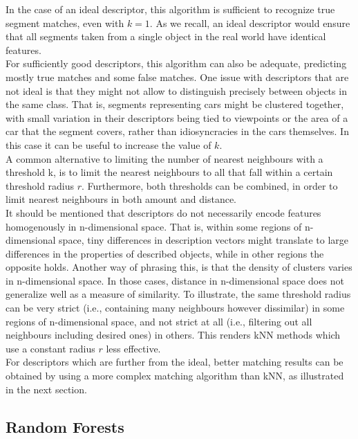 In the case of an ideal descriptor, this algorithm is sufficient to recognize true segment matches, even with $k = 1$. As we recall, an ideal descriptor would ensure that all segments taken from a single object in the real world have identical features.\\ 

For sufficiently good descriptors, this algorithm can also be adequate, predicting mostly true matches and some false matches. One issue with descriptors that are not ideal is that they might not allow to distinguish precisely between objects in the same class.  
That is, segments representing cars might be clustered together, with small variation in their descriptors being tied to viewpoints or the area of a car that the segment covers, rather than idiosyncracies in the cars themselves. In this case it can be useful to increase the value of $k$.\\

A common alternative to limiting the number of nearest neighbours with a threshold k, is to limit the nearest neighbours to all that fall within a certain threshold radius $r$. Furthermore, both thresholds can be combined, in order to limit nearest neighbours in both amount and distance.\\

It should be mentioned that descriptors do not necessarily encode features homogenously in n-dimensional space. That is, within some regions of n-dimensional space, tiny differences in description vectors might translate to large differences in the properties of described objects, while in other regions the opposite holds. Another way of phrasing this, is that the density of clusters varies in n-dimensional space. In those cases, distance in n-dimensional space does not generalize well as a measure of similarity. To illustrate, the same threshold radius can be very strict (i.e., containing many neighbours however dissimilar) in some regions of n-dimensional space, and not strict at all (i.e., filtering out all neighbours including desired ones) in others. This renders kNN methods which use a constant radius $r$ less effective.\\

For descriptors which are further from the ideal, better matching results can be obtained by using a more complex matching algorithm than kNN, as illustrated in the next section.

\subsection{Random Forests}
\label{subsec:RF}

